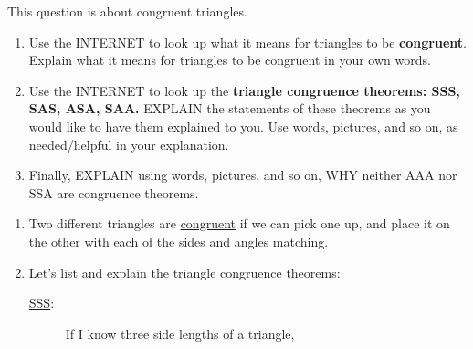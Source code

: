 \documentclass[noauthor,nooutcomes,handout,12pt]{ximera}
\begin{document}
\begin{question} This question is about congruent triangles.
  \begin{enumerate}
  \item Use the INTERNET to look up what it means for triangles to be
    \textbf{congruent}. Explain what it means for triangles to be
    congruent in your own words.
  \item Use the INTERNET to look up the \textbf{triangle congruence
    theorems: SSS, SAS, ASA, SAA.} EXPLAIN the statements of these
    theorems as you would like to have them explained to you. Use
    words, pictures, and so on, as needed/helpful in your explanation.
  \item Finally, EXPLAIN using words, pictures, and so on, WHY neither AAA
  nor SSA are congruence theorems.
  \end{enumerate}

  \begin{freeResponse}
    \begin{enumerate}
    \item Two different triangles are \underline{congruent} if we can pick one up,
      and place it on the other with each of the sides and angles
      matching.

    \item Let's list and explain the triangle congruence theorems:
    \begin{description}
    \item[\bsifamily\underline{SSS}:] If I know three side lengths
      of a triangle,
      \begin{center}
\end{center}
\end{description}
\end{enumerate}
\end{freeResponse}
\end{question}
\end{document}
